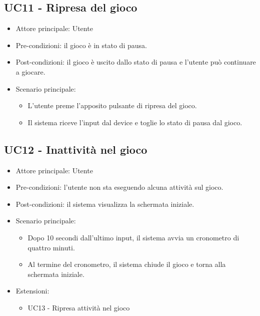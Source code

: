 \subsection{UC11 - Ripresa del gioco}
\begin{itemize}
    \item Attore principale: Utente
    \item Pre-condizioni: il gioco è in stato di pausa.
    \item Post-condizioni: il gioco è uscito dallo stato di pausa e l'utente può continuare a giocare.
    \item Scenario principale: \begin{itemize}
        \item L'utente preme l'apposito pulsante di ripresa del gioco.
        \item Il sistema riceve l'input dal device e toglie lo stato di pausa dal gioco.
    \end{itemize}
\end{itemize}

\subsection{UC12 - Inattività nel gioco}
\begin{itemize}
    \item Attore principale: Utente
    \item Pre-condizioni: l'utente non sta eseguendo alcuna attività sul gioco.
    \item Post-condizioni: il sistema visualizza la schermata iniziale.
    \item Scenario principale: \begin{itemize}
        \item Dopo 10 secondi dall'ultimo input, il sistema avvia un cronometro di quattro minuti.
        \item Al termine del cronometro, il sistema chiude il gioco e torna alla schermata iniziale.
    \end{itemize}
    \item Estensioni: \begin{itemize}
        \item UC13 - Ripresa attività nel gioco
    \end{itemize}
\end{itemize}

